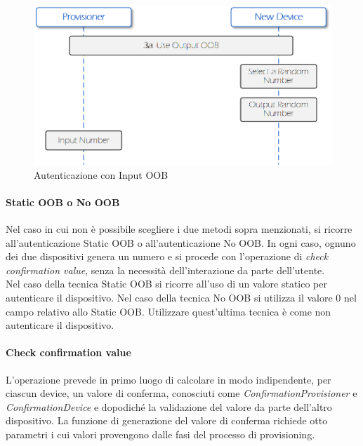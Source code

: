 \begin{figure}[!ht]
    \centering
    \includegraphics[width = \textwidth]{images/Provisioning_OOB_output.png}
    \caption{Autenticazione con Input OOB}
    \label{fig:provisioning_input_OOB}
\end{figure}

\paragraph{Static OOB o No OOB}
Nel caso in cui non è possibile scegliere i due metodi sopra menzionati, si ricorre all'autenticazione Static OOB o all'autenticazione No OOB.
In ogni caso, ognuno dei due dispositivi genera un numero e si procede con l'operazione di \textit{check confirmation value}, senza la necessità dell'interazione da parte dell'utente. \\
Nel caso della tecnica Static OOB si ricorre all'uso di un valore statico per autenticare il dispositivo. Nel caso della tecnica No OOB si utilizza il valore 0 nel campo relativo allo Static OOB. Utilizzare quest'ultima tecnica è come non autenticare il dispositivo.

\paragraph{Check confirmation value}
L'operazione prevede in primo luogo di calcolare in modo indipendente, per ciascun device, un valore di conferma, conosciuti come \textit{ConfirmationProvisioner} e \textit{ConfirmationDevice} e dopodiché la validazione del valore da parte dell'altro dispositivo. La funzione di generazione del valore di conferma richiede otto parametri i cui valori provengono dalle fasi del processo di provisioning.

